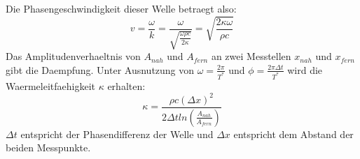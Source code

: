 Die Phasengeschwindigkeit dieser Welle betraegt also:
\begin{equation}
    v=\frac{\omega}{k}=\frac{\omega}{\sqrt{\frac{\omega \rho c}{2\kappa}}}=\sqrt{\frac{2\kappa\omega}{\rho c}}
\end{equation}
Das Amplitudenverhaeltnis von $A_{nah}$ und $A_{fern}$ an zwei Messtellen $x_{nah}$ und $x_{fern}$ gibt die Daempfung. Unter Ausnutzung von $\omega=\frac{2\pi}{T^*}$ und $\phi=\frac{2\pi\Delta t}{T^*}$ wird die Waermeleitfaehigkeit $\kappa$ erhalten:
\begin{equation}
    \kappa=\frac{\rho c (\Delta x)^2}{2\Delta t ln(\frac{A_{nah}}{A_{fern}})}
\end{equation}
$\Delta t$ entspricht der Phasendifferenz der Welle und $\Delta x$ entspricht dem Abstand der beiden Messpunkte.